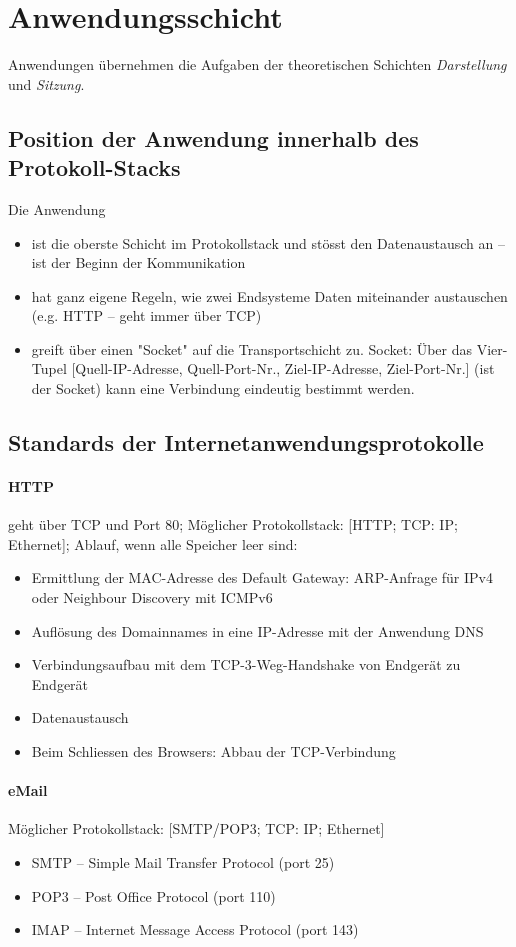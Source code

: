 \documentclass[a4paper,12pt]{article}
\begin{document}
\section{Anwendungsschicht}
Anwendungen übernehmen die Aufgaben der theoretischen Schichten \emph{Darstellung} und \emph{Sitzung}.

\subsection{Position der Anwendung innerhalb des Protokoll-Stacks}
Die Anwendung 
\begin{itemize}
\item ist die oberste Schicht im Protokollstack und stösst den Datenaustausch an -- ist der Beginn der Kommunikation
\item hat ganz eigene Regeln, wie zwei Endsysteme Daten miteinander austauschen (e.g. HTTP -- geht immer über TCP)
\item greift über einen "Socket" auf die Transportschicht zu. Socket: Über das Vier-Tupel [Quell-IP-Adresse, Quell-Port-Nr., Ziel-IP-Adresse, Ziel-Port-Nr.] (ist der Socket) kann eine Verbindung eindeutig bestimmt werden.
\end{itemize}


\subsection{Standards der Internetanwendungsprotokolle}

\paragraph{HTTP} geht über TCP und Port 80; Möglicher Protokollstack: [HTTP; TCP: IP; Ethernet]; Ablauf, wenn alle Speicher leer sind:
\begin{itemize}
\item Ermittlung der MAC-Adresse des Default Gateway: ARP-Anfrage für IPv4 oder Neighbour Discovery mit ICMPv6
\item Auflösung des Domainnames in eine IP-Adresse mit der Anwendung DNS
\item Verbindungsaufbau mit dem TCP-3-Weg-Handshake von Endgerät zu Endgerät
\item Datenaustausch
\item Beim Schliessen des Browsers: Abbau der TCP-Verbindung
\end{itemize}

\paragraph{eMail}
Möglicher Protokollstack: [SMTP/POP3; TCP: IP; Ethernet]
\begin{itemize}
\item SMTP -- Simple Mail Transfer Protocol (port 25)
\item POP3 -- Post Office Protocol (port 110)
\item IMAP -- Internet Message Access Protocol (port 143)
\end{itemize}
\end{document}
